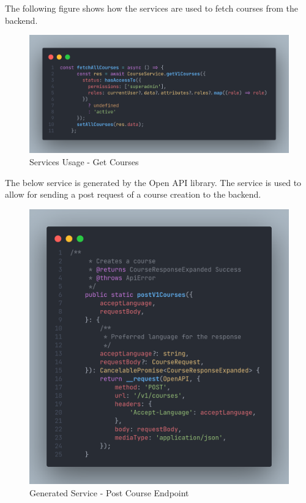\begin{justify}
        \vspace{-0.5cm}
        \newendline The following figure shows how the services are used to fetch courses from the backend.

        \begin{figure}[H]
            \centerline{\includegraphics[width=145mm,scale=1]{figures/implementation_and_testing/implementation/frontend/services_usage.png}}
            \caption{Services Usage - Get Courses}
        \end{figure}

        \vspace{-0.5cm}
        \newendline The below service is generated by the Open API library. The service is used to allow for sending a post request of a course creation to the backend.
        
        \begin{figure}[H]
            \centerline{\includegraphics[width=130mm,scale=1]{figures/implementation_and_testing/implementation/frontend/services_course.png}}
            \caption{Generated Service - Post Course Endpoint}
        \end{figure}


\end{justify}
